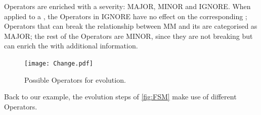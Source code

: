 \textsf{Operator}s are enriched with a \textsf{severity}: \textsf{MAJOR}, 
\textsf{MINOR} and \textsf{IGNORE}. 
When applied to a \metamodel, the \textsf{Operator}s in \textsf{IGNORE} have no 
effect on the corresponding \viewtypes; \textsf{Operator}s that can break the 
relationship between \textsf{MM} and its \viewtypes are categorised as \textsf{MAJOR}; 
the rest of the \textsf{Operator}s are \textsf{MINOR}, since they are not 
breaking but can enrich the \viewtypes with additional information.

\begin{figure}[t]
    \centering
    \texttt{[image: Change.pdf]}
    \caption{Possible \textsf{Operator}s for \metamodel evolution.}
    \label{fig:Operator}
\end{figure}

Back to our example, the evolution steps of \cref{fig:FSM} make use of different \textsf{Operator}s.
